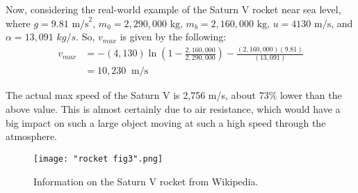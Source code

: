 \documentclass{article}
\begin{document}
Now, considering the real-world example of the Saturn V rocket near sea level, where $g = 9.81$ $\text{m/s}^2,\, m_0 = 2,290,000$ $\text{kg},\, m_b = 2,160,000$ $\text{kg}$, $u = 4130$ $\text{m/s}$, and $\alpha = 13,091$ $kg/s$. So, $v_{max}$ is given by the following:
\begin{equation}
\begin{aligned}
v_{max} &= -(4,130)\ln\left(1 - \frac{2,160,000}{2,290,000}\right) - \frac{(2,160,000)(9.81)}{(13,091)} \\
&= 10,230\;\;\text{m/s}
\end{aligned}
\end{equation}

The actual max speed of the Saturn V is 2,756 m/s, about 73\% lower than the above value. This is almost certainly due to air resistance, which would have a big impact on such a large object moving at such a high speed through the atmosphere.

\begin{figure}[H]
	\centering
	\texttt{[image: "rocket fig3".png]}
	\caption{Information on the Saturn V rocket from Wikipedia.}\label{Fig:SaturnVInfo}
\end{figure}
\end{document}
